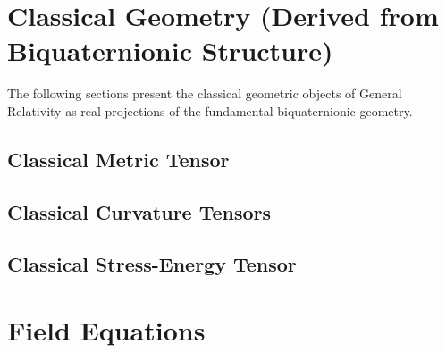 \documentclass[12pt,a4paper]{article}
\begin{document}








\section{Classical Geometry (Derived from Biquaternionic Structure)}
\label{sec:classical_geometry}

The following sections present the classical geometric objects of General Relativity as real projections of the fundamental biquaternionic geometry.

\subsection{Classical Metric Tensor}





\subsection{Classical Curvature Tensors}



\subsection{Classical Stress-Energy Tensor}




\section{Field Equations}
\label{sec:field_equations}
\end{document}
